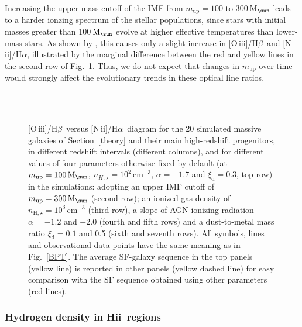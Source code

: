 \documentclass[fleqn,usenatbib]{mnras}
\newcommand{\Msun}{\hbox{M$_\sun$}}
\newcommand{\hii}{\hbox{H{\sc ii}}}
\newcommand{\oiiihb}{\hbox{[O\,{\sc iii}]/H$\beta$}}
\newcommand{\niiha}{\hbox{[N\,{\sc ii}]/H$\alpha$}}
\begin{document}
Increasing the upper mass cutoff of the IMF from $m_{\mathrm{up}}=100$  
to 300\,$\Msun$ leads to a harder ionzing spectrum of the stellar
populations, since stars with initial masses greater than 100\,$\Msun$
evolve at higher effective temperatures than lower-mass stars. As
shown by \citet{Gutkin16}, this causes only a slight increase in
\oiiihb\ and \niiha, illustrated by  the marginal difference between
the red and yellow lines in the second row of
Fig.~\ref{freeparam}. Thus, we do not expect that changes in
$m_{\mathrm{up}}$ over time would strongly affect the evolutionary
trends in these optical line ratios.   
\begin{figure*}
\vspace{-0.5cm}
\vspace{-1.3cm}\\
\vspace{-1.3cm}\\
\vspace{-0.4cm}
\caption{\oiiihb\ versus \niiha\ diagram for the 20
   simulated massive galaxies of Section~\ref{theory} and their main high-redshift
   progenitors, in different redshift intervals (different columns), and for different 
   values of four parameters otherwise fixed by default (at $m_{\mathrm{up}} 
   =  100\,\Msun$, $n_{H, \star} = 10^2\,{\mathrm{cm}}^{-3}$, $\alpha = -1.7$ 
   and $\xi_\mathrm{d} = 0.3$, top row) in the simulations: adopting an upper
   IMF cutoff of $m_{\mathrm{up}} =  300\,\Msun$ (second row); an ionized-gas
   density of $n_{\mathrm{H}, \star}=10^3\,\mathrm{cm}^{-3}$ (third row), a slope
   of AGN ionizing radiation $\alpha =-1.2$ and $-2.0$ (fourth and fifth rows) and 
   a dust-to-metal mass ratio $\xi_\mathrm{d}=0.1$ and 0.5 (sixth and seventh rows).
    All symbols, lines and observational 
    data points have the same meaning as in Fig.~\ref{BPT}.
   The average SF-galaxy sequence in the top panels (yellow
line) is reported in other panels (yellow dashed line) for easy comparison with 
the SF sequence obtained using other parameters (red lines).}\label{freeparam}       
\end{figure*}

\subsubsection{Hydrogen density in \hii\ regions}
\end{document}
